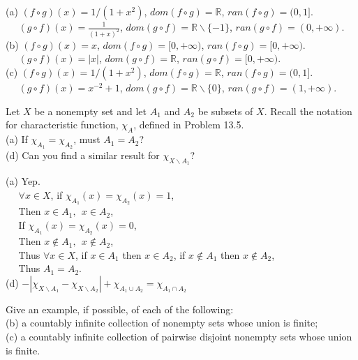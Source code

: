 \documentclass[11pt, a4paper, UTF8]{ctexart}
\begin{document}
\begin{revision}
  (a) $(f \circ g)(x) = 1/(1 + x^{2})$, $dom(f \circ g) = \mathbb{R}$, 
  $ran(f \circ g) = (0,1]$.\\
  $~~~~~~(g \circ f)(x) = \frac{1}{(1 + x)^{2}}$, $dom(g \circ f) = \mathbb{R} \backslash \{-1\}$, 
  $ran(g \circ f) = (0,+\infty)$.\\
  (b) $(f \circ g)(x) = x$, $dom(f \circ g) = [0,+\infty)$, $ran(f \circ g) = [0,+\infty)$.\\
  $~~~~~~(g \circ f)(x) = |x|$, $dom(g \circ f) = \mathbb{R}$, $ran(g \circ f) = [0,+\infty)$.\\
  (c) $(f \circ g)(x) = 1/(1 + x^{2})$, $dom(f \circ g) = \mathbb{R}$, 
  $ran(f \circ g) = (0,1]$.\\
  $~~~~~~(g \circ f)(x) = x^{-2} + 1$, $dom(g \circ f) = \mathbb{R} \backslash \{0\}$, 
  $ran(g \circ f) = (1,+\infty)$.
\end{revision}
\begin{problem}[UD: 16.22]
    Let $X$ be a nonempty set and let $A_{1}$ and $A_{2}$ be subsets of $X$. 
    Recall the notation for characteristic function, $\chi _{A}$, defined in 
    Problem 13.5.\\
    (a) If $\chi_{A_{1}} = \chi_{A_{2}}$, must $A_{1} = A_{2}$?\\
    (d) Can you find a similar result for $\chi_{X\backslash A_{1}}$?
\end{problem}

\begin{revision}
    (a) Yep.\\
    $~~~~~~\forall x \in X$, if $\chi_{A_{1}}(x) = \chi_{A_{2}}(x) = 1$,\\
    $~~~~~~$Then $x \in A_{1},~~x \in A_{2}$,\\
    $~~~~~~$If $\chi_{A_{1}}(x) = \chi_{A_{2}}(x) = 0$,\\
    $~~~~~~$Then $x \notin A_{1},~~x \notin A_{2}$,\\
    $~~~~~~$Thus $\forall x \in X$, if $x \in A_{1}$ then $x \in A_{2}$, 
    if $x \notin A_{1}$ then $x \notin A_{2}$,\\
    $~~~~~~$Thus $A_{1} = A_{2}$.\\
    (d) $-|\chi_{X \backslash A_{1}} - \chi_{X \backslash A_{2}}| + \chi_{A_{1} \cup A_{2}} 
    = \chi_{A_{1} \cap A_{2}}$
\end{revision}
\begin{problem}[UD: 22.1]
    Give an example, if possible, of each of the following:\\
  (b) a countably infinite collection of nonempty sets whose union is 
  finite;\\
  (c) a countably infinite collection of pairwise disjoint nonempty 
  sets whose union is finite.
\end{problem}
\end{document}
